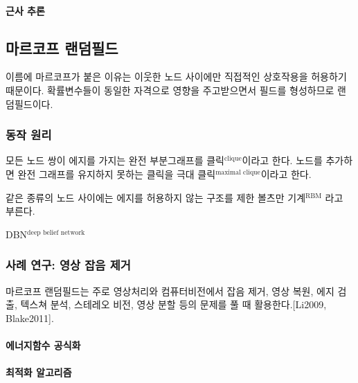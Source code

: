 \documentclass [12pt] {oblivoir}
\let\oldsubsubsection=\subsubsection
\renewcommand{\subsubsection}
{
  \filbreak
  \oldsubsubsection
}
\begin{document}
\vspace{3mm}

\paragraph*{근사 추론}\mbox{}

\vspace{3mm}

\subsection{마르코프 랜덤필드}

이름에 마르코프가 붙은 이유는 이웃한 노드 사이에만 직접적인 상호작용을 허용하기 때문이다. 확률변수들이 동일한 자격으로 영향을 주고받으면서 필드를 형성하므로 랜덤필드이다.

\subsubsection{동작 원리}

모든 노드 쌍이 에지를 가지는 완전 부분그래프를 클릭$^{\text{clique}}$이라고 한다. 노드를 추가하면 완전 그래프를 유지하지 못하는 클릭을 극대 클릭$^{\text{maximal clique}}$이라고 한다.

\vspace{3mm}
같은 종류의 노드 사이에는 에지를 허용하지 않는 구조를 제한 볼츠만 기계$^{\text{RBM}}$ 라고 부른다.

DBN$^\text{deep belief network}$

\subsubsection{사례 연구: 영상 잡음 제거}

마르코프 랜덤필드는 주로 영상처리와 컴퓨터비전에서 잡음 제거, 영상 복원, 에지 검출, 텍스쳐 분석, 스테레오 비전, 영상 분할 등의 문제를 풀 때 활용한다.[Li2009, Blake2011].

\paragraph*{에너지함수 공식화}\mbox{}

\vspace{3mm}

\paragraph*{최적화 알고리즘}\mbox{}
\end{document}
